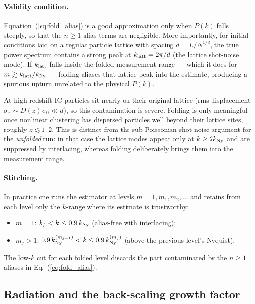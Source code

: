 \documentclass[12pt]{article}
\begin{document}
\paragraph{Validity condition.}
Equation~(\ref{eq:fold_alias}) is a good approximation only when $P(k)$
falls steeply, so that the $n\geq1$ alias terms are negligible.  More
importantly, for initial conditions laid on a regular particle lattice
with spacing $d = L/N^{1/3}$, the true power spectrum contains a strong
peak at $k_{\rm latt} = 2\pi/d$ (the lattice shot-noise mode).  If
$k_{\rm latt}$ falls inside the folded measurement range — which it does
for $m \gtrsim k_{\rm latt}/k_{\rm Ny}$ — folding aliases that lattice
peak into the estimate, producing a spurious upturn unrelated to the
physical $P(k)$.

At high redshift IC particles sit nearly on their original lattice
(rms displacement $\sigma_x \sim D(z)\,\sigma_0 \ll d$), so this
contamination is severe.  Folding is only meaningful once nonlinear
clustering has dispersed particles well beyond their lattice sites,
roughly $z \lesssim 1$--$2$.  This is distinct from the sub-Poissonian
shot-noise argument for the \emph{unfolded} run: in that case the
lattice modes appear only at $k \geq 2k_{\rm Ny}$ and are suppressed
by interlacing, whereas folding deliberately brings them into the
measurement range.

\paragraph{Stitching.}
In practice one runs the estimator at levels $m = 1, m_1, m_2, \ldots$
and retains from each level only the $k$-range where its estimate is
trustworthy:
\begin{itemize}
  \item $m=1$: $k_f < k \leq 0.9\,k_{\rm Ny}$ (alias-free with interlacing);
  \item $m_j > 1$: $0.9\,k_{\rm Ny}^{(m_{j-1})} < k \leq
        0.9\,k_{\rm Ny}^{(m_j)}$ (above the previous level's Nyquist).
\end{itemize}
The low-$k$ cut for each folded level discards the part contaminated by
the $n\geq1$ aliases in Eq.~(\ref{eq:fold_alias}).

\subsection{Radiation and the back-scaling growth factor}
\label{sec:backscaling_radiation}
\end{document}
